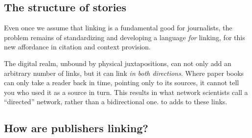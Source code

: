 \subsection{The structure of stories}






Even once we assume that linking is a fundamental good for journalists, the problem remains of standardizing and developing a language \emph{for} linking, for this new affordance in citation and context provision.

The digital realm, unbound by physical juxtapositions, can not only add an arbitrary number of links, but it can link \emph{in both directions}. Where paper books can only take a reader back in time, pointing only to its sources, it cannot tell you who used it as a source in turn. This results in what network scientists call a ``directed'' network, rather than a bidirectional one. to adds to these links.

\subsection{How are publishers linking?}

